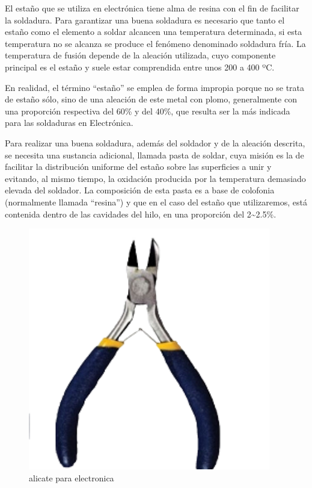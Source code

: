 \documentclass[letterpaper,10pt,english]{sphinxmanual}
\begin{document}
El estaño que se utiliza en electrónica tiene alma de resina con el fin
de facilitar la soldadura. Para garantizar una buena soldadura es
necesario que tanto el estaño como el elemento a soldar alcancen una
temperatura determinada, si esta temperatura no se alcanza se produce
el fenómeno denominado soldadura fría. La temperatura de fusión
depende de la aleación utilizada, cuyo componente principal es
el estaño y suele estar comprendida entre unos 200 a 400 ºC.

En realidad, el término ``estaño'' se emplea de forma impropia
porque no se trata de estaño sólo, sino de una aleación de este metal
con plomo, generalmente con una proporción respectiva
del 60\% y del 40\%, que resulta ser la más indicada para
las soldaduras en Electrónica.

Para realizar una buena soldadura, además del soldador
y de la aleación descrita, se necesita una sustancia adicional,
llamada pasta de soldar, cuya misión es la de facilitar la distribución
uniforme del estaño sobre las superficies a unir y evitando, al mismo
tiempo, la oxidación producida por la temperatura demasiado elevada
del soldador. La composición de esta pasta es a base de colofonia
(normalmente llamada ``resina'') y que en el caso del estaño que
utilizaremos, está contenida dentro de las cavidades del hilo,
en una proporción del 2\textasciitilde{}2.5\%.
\newpage\begin{figure}[htbp]
\centering
\capstart

\includegraphics[width=300pt]{alicate.png}
\caption{alicate para electronica}\end{figure}
\end{document}
